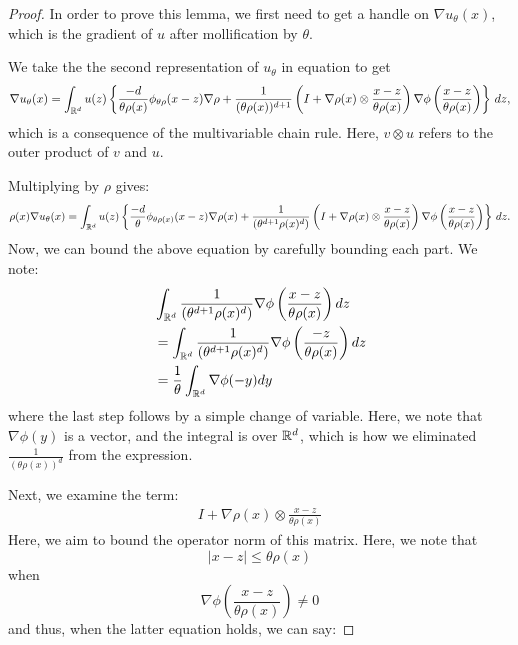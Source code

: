   \begin{proof}
  In order to prove this lemma, we first need to get a handle on
  $\nabla u_\theta(x)$, which is the gradient of $u$ after
  mollification by $\theta$.

  We take the
  the second representation of $u_\theta$ in equation 
  to get
  \begin{align}
  \nabla u_\theta(x) 
  = \int_{\mathbb{R}^d} u(z) \left\{
    \frac{-d}{\theta \rho(x)} \phi_{\theta \rho}(x-z) \nabla \rho
    + \frac{1}{(\theta \rho(x))^{d+1}} 
    \left( I 
      + \nabla \rho(x) \otimes \frac{x-z}{\theta \rho(x)} \right)
    \nabla \phi \left(\frac{x-z}{\theta \rho(x)} \right) \right\}
    \, dz,
  \end{align}
  which is a consequence of the multivariable chain rule. Here,
  $v \otimes u$ refers to the outer product of $v$ and $u$.

  Multiplying by $\rho$ gives:
  \begin{align}
  \rho (x) \nabla u_\theta(x) 
  = \int_{\mathbb{R}^d} u(z) \left\{
    \frac{-d}{\theta} \phi_{\theta \rho(x)}(x-z) \nabla
    \rho(x)
    + \frac{1}{(\theta^{d+1} \rho(x)^{d})} 
    \left( I 
      + \nabla \rho(x) \otimes \frac{x-z}{\theta \rho(x)} \right)
    \nabla \phi \left(\frac{x-z}{\theta \rho(x)} \right) \right\} \, dz.
  \end{align}
  Now, we can bound the above equation by carefully bounding each
  part. We note:
  \begin{align} \label{eq:Cphi-calculation}
    & \int_{\mathbb{R}^d} \frac{1}{(\theta^{d+1} \rho(x)^d)} \nabla
    \phi\left(\frac{x-z}{\theta \rho(x)} \right) dz
    \\
    & = \int_{\mathbb{R}^d} \frac{1}{(\theta^{d+1} \rho(x)^d)} \nabla
    \phi\left(\frac{-z}{\theta \rho(x)} \right) dz
    \\
     & = \frac{1}{\theta} \int_{\mathbb{R}^d} \nabla \phi(-y) dy
  \end{align}
  where the last step follows by a simple change of variable.
  Here, we note that $\nabla \phi(y)$ is a vector, and the
  integral is over $\mathbb{R}^d$, which is how we eliminated
  $\frac{1}{(\theta \rho(x))^d}$ from the expression.

  Next, we examine the term: 
  \begin{align}
    I + \nabla \rho(x) \otimes \frac{x-z}{\theta \rho(x)}
  \end{align}
  Here, we aim to bound the operator norm of this matrix. Here,
  we note that 
  \[ |x - z| \leq \theta \rho(x) \]
  when 
  \[
    \nabla \phi\left(\frac{x-z}{\theta \rho(x)}\right) \not= 0
  \]
  and thus, when the latter equation holds, we can say:


\end{proof}
